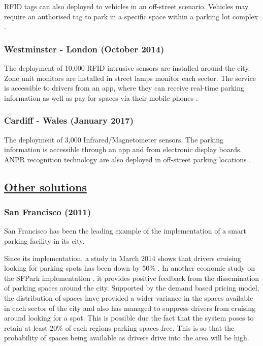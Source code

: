 \ac{RFID} tags can also deployed to vehicles in an off-street scenario. Vehicles may require an authorised tag to park in a specific space within a parking lot complex \citep{2017RFIDSmartParking}.

\subsubsection{Westminster - London (October 2014)}
The deployment of 10,000 RFID intrusive sensors are installed around the city. Zone unit monitors are installed in street lamps monitor each sector. The service is accessible to drivers from an app, where they can receive real-time parking information as well as pay for spaces via their mobile phones \citep{2013WestminsterSmartParking}.

\subsubsection{Cardiff - Wales (January 2017)}
The deployment of 3,000 Infrared/Magnetometer sensors. The parking information is accessible through an app and from electronic display boards. \ac{ANPR} recognition technology are also deployed in off-street parking locations \citep{2017CardiffSmartParking}.

\subsection*{\underline{Other solutions}}
\subsubsection{San Francisco (2011)}
San Francisco has been the leading example of the implementation of a smart parking facility in its city.

Since its implementation, a study in March 2014 shows that drivers cruising looking for parking spots has been down by 50\% \citep{Millard-Ball2014IsExperiment}. In another economic study on the SFPark implementation \citep{Shriver2016UnderstandingProject}, it provides positive feedback from the dissemination of parking spaces around the city. Supported by the demand based pricing model, the distribution of spaces have provided a wider variance in the spaces available in each sector of the city and also has managed to suppress drivers from cruising around looking for a spot. This is possible due the fact that the system poses to retain at least 20\% of each regions parking spaces free. This is so that the probability of spaces being available as drivers drive into the area will be high.